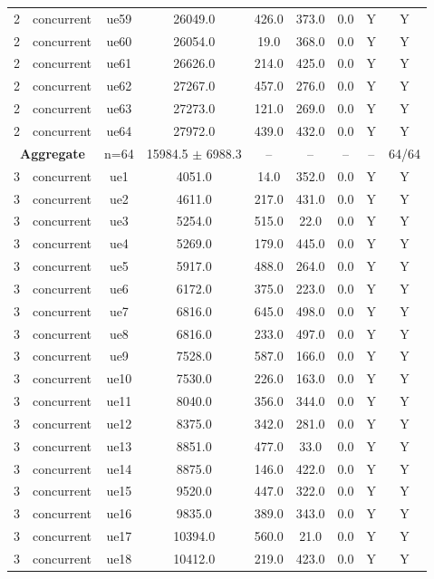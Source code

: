 \begin{table}[ht]
\begin{tabular}{|c|c|c|c|c|c|c|c|c|}
2 & concurrent & ue59 & 26049.0 & 426.0 & 373.0 & 0.0 & Y & Y \\
2 & concurrent & ue60 & 26054.0 & 19.0 & 368.0 & 0.0 & Y & Y \\
2 & concurrent & ue61 & 26626.0 & 214.0 & 425.0 & 0.0 & Y & Y \\
2 & concurrent & ue62 & 27267.0 & 457.0 & 276.0 & 0.0 & Y & Y \\
2 & concurrent & ue63 & 27273.0 & 121.0 & 269.0 & 0.0 & Y & Y \\
2 & concurrent & ue64 & 27972.0 & 439.0 & 432.0 & 0.0 & Y & Y \\
\multicolumn{2}{|c|}{\textbf{Aggregate}} & n=64 & 15984.5 $\pm$ 6988.3 & -- & -- & -- & -- & 64/64 \\
\hline
3 & concurrent & ue1 & 4051.0 & 14.0 & 352.0 & 0.0 & Y & Y \\
3 & concurrent & ue2 & 4611.0 & 217.0 & 431.0 & 0.0 & Y & Y \\
3 & concurrent & ue3 & 5254.0 & 515.0 & 22.0 & 0.0 & Y & Y \\
3 & concurrent & ue4 & 5269.0 & 179.0 & 445.0 & 0.0 & Y & Y \\
3 & concurrent & ue5 & 5917.0 & 488.0 & 264.0 & 0.0 & Y & Y \\
3 & concurrent & ue6 & 6172.0 & 375.0 & 223.0 & 0.0 & Y & Y \\
3 & concurrent & ue7 & 6816.0 & 645.0 & 498.0 & 0.0 & Y & Y \\
3 & concurrent & ue8 & 6816.0 & 233.0 & 497.0 & 0.0 & Y & Y \\
3 & concurrent & ue9 & 7528.0 & 587.0 & 166.0 & 0.0 & Y & Y \\
3 & concurrent & ue10 & 7530.0 & 226.0 & 163.0 & 0.0 & Y & Y \\
3 & concurrent & ue11 & 8040.0 & 356.0 & 344.0 & 0.0 & Y & Y \\
3 & concurrent & ue12 & 8375.0 & 342.0 & 281.0 & 0.0 & Y & Y \\
3 & concurrent & ue13 & 8851.0 & 477.0 & 33.0 & 0.0 & Y & Y \\
3 & concurrent & ue14 & 8875.0 & 146.0 & 422.0 & 0.0 & Y & Y \\
3 & concurrent & ue15 & 9520.0 & 447.0 & 322.0 & 0.0 & Y & Y \\
3 & concurrent & ue16 & 9835.0 & 389.0 & 343.0 & 0.0 & Y & Y \\
3 & concurrent & ue17 & 10394.0 & 560.0 & 21.0 & 0.0 & Y & Y \\
3 & concurrent & ue18 & 10412.0 & 219.0 & 423.0 & 0.0 & Y & Y \\

\end{tabular}
\end{table}
